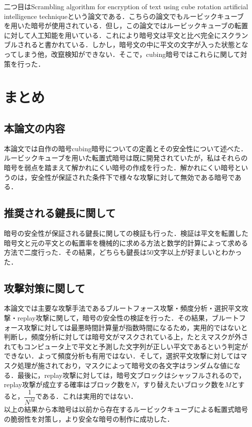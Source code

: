 \documentclass[a4p]{jarticle}
\begin{document}
二つ目はScrambling algorithm for encryption of text using cube rotation artificial intelligence technique\cite{Scrambling algorithm}という論文である．こちらの論文でもルービックキューブを用いた暗号が使用されている．但し，この論文ではルービックキューブの転置に対して人工知能を用いている．これにより暗号文は平文と比べ完全にスクランブルされると書かれている．しかし，暗号文の中に平文の文字が入った状態となってしまう他，改竄検知ができない．そこで，cubing暗号ではこれらに関して対策を行った．


\section{まとめ}

\subsection{本論文の内容}
本論文では自作の暗号cubing暗号についての定義とその安全性について述べた．ルービックキューブを用いた転置式暗号は既に開発されていたが，私はそれらの暗号を弱点を踏まえて解かれにくい暗号の作成を行った．解かれにくい暗号というのは，安全性が保証された条件下で様々な攻撃に対して無効である暗号である．

\subsection{推奨される鍵長に関して}
暗号の安全性が保証される鍵長に関しての検証も行った．検証は平文を転置した暗号文と元の平文との転置率を機械的に求める方法と数学的計算によって求める方法で二度行った．その結果，どちらも鍵長は50文字以上が好ましいとわかった．

\subsection{攻撃対策に関して}
本論文では主要な攻撃手法であるブルートフォース攻撃・頻度分析・選択平文攻撃・replay攻撃に関して，暗号の安全性の検証を行った．その結果，ブルートフォース攻撃に対しては最悪時間計算量が指数時間になるため，実用的ではないと判断し，頻度分析に対しては暗号文がマスクされている上，たとえマスクが外されてもコンピュータ上で平文と予測した文字列が正しい平文であるという判定ができない．よって頻度分析も有用ではない．そして，選択平文攻撃に対してはマスク処理が施されており，マスクによって暗号文の各文字はランダムな値になる．最後に，replay攻撃に対しては，暗号文ブロックはシャッフルされるので，replay攻撃が成立する確率はブロック数を\(N\)，すり替えたいブロック数を\(M\)とすると，\(\dfrac{1}{N^M}\)である．これは実用的ではない．\\
以上の結果から本暗号は以前から存在するルービックキューブによる転置式暗号の脆弱性を対策し，より安全な暗号の制作に成功した．
\end{document}
